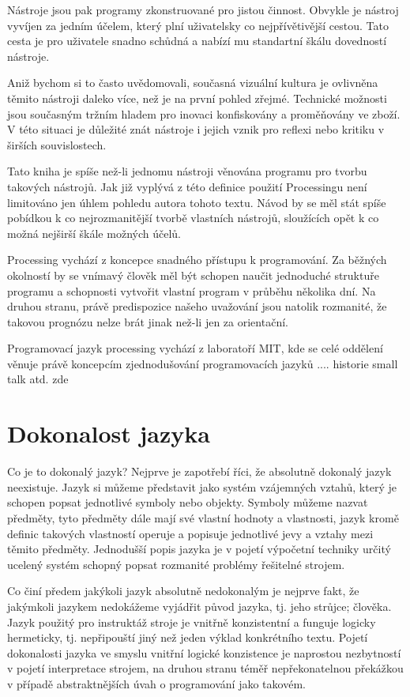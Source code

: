 \documentclass[12pt,twopage]{book}
\newcommand{\oddil}[1]{\section{#1}\label{sec:#1}}
\begin{document}
Nástroje jsou pak programy zkonstruované pro jistou činnost. Obvykle je nástroj vyvíjen za jedním účelem, který plní uživatelsky co nejpřívětivější cestou. Tato cesta je pro uživatele snadno schůdná a nabízí mu standartní škálu dovedností nástroje.

Aniž bychom si to často uvědomovali, současná vizuální kultura je ovlivněna těmito nástroji daleko více, než je na první pohled zřejmé. Technické možnosti jsou současným tržním hladem pro inovaci konfiskovány a proměňovány ve zboží. V této situaci je důležité znát nástroje i jejich vznik pro reflexi nebo kritiku v širších souvislostech.

Tato kniha je spíše než-li jednomu nástroji věnována programu pro tvorbu takových nástrojů. Jak již vyplývá z této definice použití Processingu není limitováno jen úhlem pohledu autora tohoto textu. Návod by se měl stát spíše pobídkou k co nejrozmanitější tvorbě vlastních nástrojů, sloužících opět k co možná nejširší škále možných účelů.

Processing vychází z koncepce snadného přístupu k programování. Za běžných okolností by se vnímavý člověk měl být schopen naučit jednoduché struktuře programu a schopnosti vytvořit vlastní program v průběhu několika dní. Na druhou stranu, právě predispozice našeho uvažování jsou natolik rozmanité, že takovou prognózu nelze brát jinak než-li jen za orientační.


Programovací jazyk processing vychází z laboratoří MIT, kde se celé oddělení věnuje právě koncepcím zjednodušování programovacích jazyků .... historie small talk atd. zde


\oddil{Dokonalost jazyka}

Co je to dokonalý jazyk? Nejprve je zapotřebí říci, že absolutně dokonalý jazyk neexistuje. Jazyk si můžeme představit jako systém vzájemných vztahů, který je schopen popsat jednotlivé symboly nebo objekty. Symboly můžeme nazvat předměty, tyto předměty dále mají své vlastní hodnoty a vlastnosti, jazyk kromě definic takových vlastností operuje a popisuje jednotlivé jevy a vztahy mezi těmito předměty. Jednodušší popis jazyka je v pojetí výpočetní techniky určitý ucelený systém schopný popsat rozmanité problémy řešitelné strojem.

Co činí předem jakýkoli jazyk absolutně nedokonalým je nejprve fakt, že jakýmkoli jazykem nedokážeme vyjádřit původ jazyka, tj. jeho strůjce; člověka. Jazyk použitý pro instruktáž stroje je vnitřně konzistentní a funguje logicky hermeticky, tj. nepřipouští jiný než jeden výklad konkrétního textu. Pojetí dokonalosti jazyka ve smyslu vnitřní logické konzistence je naprostou nezbytností v pojetí interpretace strojem, na druhou stranu téměř nepřekonatelnou překážkou v případě abstraktnějších úvah o programování jako takovém.
\end{document}
